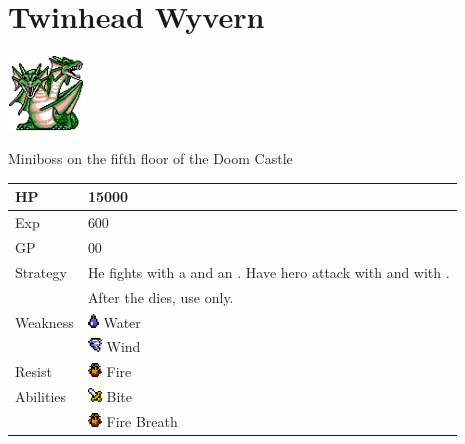 \section{Twinhead Wyvern}
\label{monster:twinhead_wyvern}

\includegraphics[height=2cm,keepaspectratio]{./resources/monster/twinhead_wyvern}

Miniboss on the fifth floor of the Doom Castle

\begin{longtable}{ l p{9cm} }
	HP
	& 15000
\\ \hline
	Exp
	& 600
\\ \hline
	GP
	& 00
\\ \hline
	Strategy
	& He fights with a \nameref{monster:stheno} and an \nameref{monster:iflyte}. Have hero attack with \nameref{spell:meteor} and \nameref{char:phoebe} with \nameref{spell:white}. \\
	& After the \nameref{monster:stheno} dies, use \nameref{spell:white} only.
\\ \hline
	Weakness
	& \includegraphics[height=1em,keepaspectratio]{./resources/effects/water} Water \\
	& \includegraphics[height=1em,keepaspectratio]{./resources/effects/wind} Wind
\\ \hline
	Resist
	& \includegraphics[height=1em,keepaspectratio]{./resources/effects/fire} Fire
\\ \hline
	Abilities
	& \includegraphics[height=1em,keepaspectratio]{./resources/effects/damage} Bite \\
	& \includegraphics[height=1em,keepaspectratio]{./resources/effects/fire} Fire Breath \\

\end{longtable}
